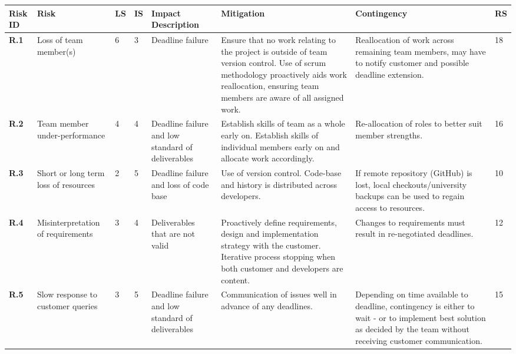 \begin{longtable}[H]{| p{0.7cm} | p{2cm} | p{0.3cm} | p{0.3cm} | p{2.4cm} | p{4.1cm} | p{3cm} | p{0.4cm} |}
  \hline
  \cellcolor{titleColor}\textbf{Risk ID} &
  \cellcolor{titleColor}\textbf{Risk} &
  \cellcolor{titleColor}\textbf{LS} &
  \cellcolor{titleColor}\textbf{IS} &
  \cellcolor{titleColor}\textbf{Impact Description} &
  \cellcolor{titleColor}\textbf{Mitigation} &
  \cellcolor{titleColor}\textbf{Contingency} &
  \cellcolor{titleColor}\textbf{RS}\\

  \hline \textbf{R.1}
  & Loss of team member(s)
  & 6
  & 3
  & Deadline failure
  & Ensure that no work relating to the project is outside of team
  version control. Use of scrum methodology proactively aids work
  reallocation, ensuring team members are aware of all assigned work.
  & Reallocation of work across remaining team members, may have to notify customer and possible deadline extension.
  & 18 \\

  \hline \textbf{R.2}
  & Team member under-performance
  & 4
  & 4
  & Deadline failure and low standard of deliverables
  & Establish skills of team as a whole early on. Establish skills of
  individual members early on and allocate work accordingly.
  & Re-allocation of roles to better suit member strengths.
  & 16 \\

  \hline \textbf{R.3}
  & Short or long term loss of resources
  & 2
  & 5
  & Deadline failure and loss of code base
  & Use of version control. Code-base and history is distributed across developers.
  & If remote repository (GitHub) is lost, local checkouts/university
  backups can be used to regain access to resources.
  & 10 \\

  \hline \textbf{R.4}
  & Misinterpreta\-tion of requirements
  & 3
  & 4
  & Deliverables that are not valid
  & Proactively define requirements, design and implementation
  strategy with the customer. Iterative process stopping when both
  customer and developers are content.
  & Changes to requirements must result in re-negotiated deadlines.
  & 12 \\

  \hline \textbf{R.5}
  & Slow response to customer queries
  & 3
  & 5
  & Deadline failure and low standard of deliverables
  & Communication of issues well in advance of any deadlines.
  & Depending on time available to deadline, contingency is either to
  wait - or to implement best solution as decided by the team without
  receiving customer communication.
  & 15 \\


\end{longtable}
